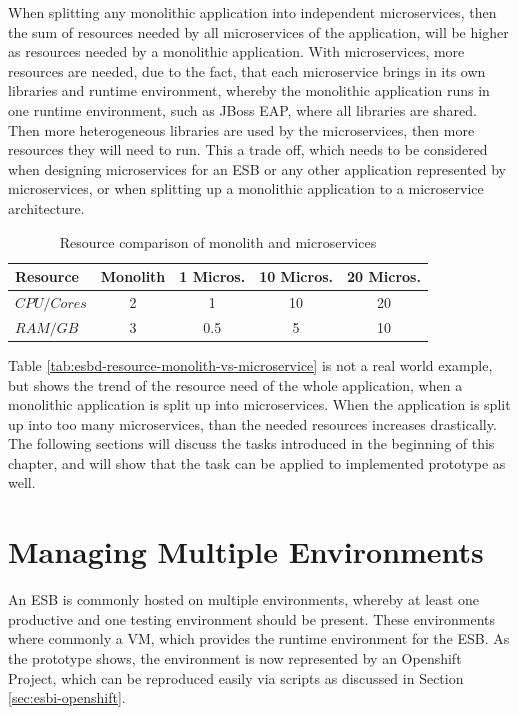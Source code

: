 When splitting any monolithic application into independent microservices, then the sum of resources needed by all microservices of the application, will be higher as resources needed by a monolithic application. With microservices, more resources are needed, due to the fact, that each microservice brings in its own libraries and runtime environment, whereby the monolithic application runs in one runtime environment, such as JBoss EAP, where all libraries are shared. Then more heterogeneous libraries are used by the microservices, then more resources they will need to run. This a trade off, which needs to be considered when designing microservices for an ESB or any other application represented by microservices, or when splitting up a monolithic application to a microservice architecture.
\newpage
{\renewcommand{\arraystretch}{1.2}%
%
	\begin{table}[h]
		\begin{tabularx}{\textwidth}{ m|c|c|c|c }	
			\textbf{Resource}    & \textbf{Monolith} & \textbf{1 Micros.} & \textbf{10 Micros.} & \textbf{20 Micros.} \\  \hline
			\textit{$CPU/Cores$} & 2                 & 1                  & 10                  & 20 \\
			\textit{$RAM/GB$}    & 3                 & 0.5                & 5                   & 10 \\ \hline
		\end{tabularx}
		\caption{Resource comparison of monolith and microservices}
		\label{tab:esbd-resource-monolith-vs-microservice}
\end{table}}

Table \vref{tab:esbd-resource-monolith-vs-microservice} is not a real world example, but shows the trend of the resource need of the whole application, when a monolithic application is split up into microservices. When the application is split up into too many microservices, than the needed resources increases drastically. \\
 
The following sections will discuss the tasks introduced in the beginning of this chapter, and will show that the task can be applied to implemented prototype as well.

\section{Managing Multiple Environments}
\label{sec:esbd-multiple-env}
An ESB is commonly hosted on multiple environments, whereby at least one productive and one testing environment should be present. These environments where commonly a VM, which provides the runtime environment for the ESB. As the prototype shows, the environment is now represented by an Openshift Project, which can be reproduced easily via scripts as discussed in Section \vref{sec:esbi-openshift}. \\

